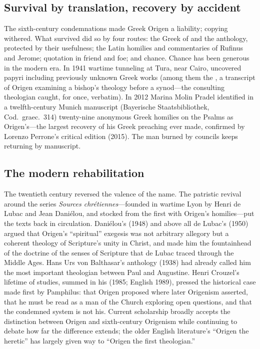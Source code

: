 \subsection{Survival by translation, recovery by accident}

The sixth-century condemnations made Greek Origen a liability; copying
withered. What survived did so by four routes: the Greek of  and the  anthology, protected by their usefulness;
the Latin homilies and commentaries of Rufinus and Jerome; quotation in
friend and foe; and chance. Chance has been generous in the modern era. In
1941 wartime tunneling at Tura, near Cairo, uncovered papyri including
previously unknown Greek works (among them the , a transcript of Origen examining a bishop's theology before a
synod---the consulting theologian caught, for once, verbatim). In 2012
Marina Molin Pradel identified in a twelfth-century Munich manuscript
(Bayerische Staatsbibliothek, Cod.\ graec.\ 314) twenty-nine anonymous
Greek homilies on the Psalms as Origen's---the largest recovery of his
Greek preaching ever made, confirmed by Lorenzo Perrone's critical edition
(2015). The man burned by councils keeps returning by manuscript.

\subsection{The modern rehabilitation}

The twentieth century reversed the valence of the name. The patristic
revival around the series \textit{Sources chr\'etiennes}---founded in wartime
Lyon by Henri de Lubac and Jean Dani\'elou, and stocked from the first with
Origen's homilies---put the texts back in circulation. Dani\'elou's
 (1948) and above all de Lubac's 
(1950) argued that Origen's ``spiritual'' exegesis was not arbitrary
allegory but a coherent theology of Scripture's unity in Christ, and made
him the fountainhead of the doctrine of the senses of Scripture that de
Lubac traced through the Middle Ages. Hans Urs von Balthasar's anthology
 (1938) had already called him the most
important theologian between Paul and Augustine. Henri Crouzel's lifetime
of studies, summed in his  (1985; English 1989), pressed
the historical case made first by Pamphilus: that Origen proposed where
later Origenism asserted, that he must be read as a man of the Church
exploring open questions, and that the condemned system is not his. Current
scholarship broadly accepts the distinction between Origen and
sixth-century Origenism while continuing to debate how far the difference
extends; the older English literature's ``Origen the heretic'' has largely
given way to ``Origen the first theologian.''

